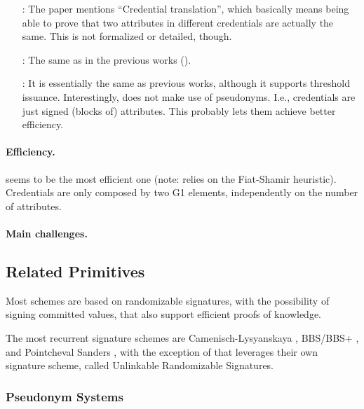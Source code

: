 \begin{enumerate}
\item[\cite{cmz14}:] The paper mentions ``Credential translation'', which
  basically means being able to prove that two attributes in different
  credentials are actually the same. This is not formalized or detailed,
  though.
\item[\cite{cdhk15}:] The same as in the previous works (\cite{cl01,cl02,cl04}).
\item[\cite{sms+19}:] It is essentially the same as previous works, although it
  supports threshold issuance. Interestingly, \cite{sms+19} does not make use
  of pseudonyms. I.e., credentials are just signed (blocks of) attributes. This
  probably lets them achieve better efficiency. 
\end{enumerate}

\paragraph{Efficiency.}

\cite{sms+19} seems to be the most efficient one (note: relies on the
Fiat-Shamir heuristic). Credentials are only composed by two G1 elements,
independently on the number of attributes.

\paragraph{Main challenges.}

\subsection{Related Primitives}

Most schemes \cite{cl01,cl02,cl04,cdhk15,sms+19} are based on randomizable
signatures, with the possibility of signing committed values, that also support
efficient proofs of knowledge.

The most recurrent signature schemes are Camenisch-Lysyanskaya \cite{cl02,cl04},
BBS/BBS+ \cite{asm06,cdl16b}, and Pointcheval Sanders \cite{ps16}, with the
exception of \cite{cdhk15} that leverages their own signature scheme, called
Unlinkable Randomizable Signatures.

\subsubsection{Pseudonym Systems}
\label{sssec:pseudonyms}

